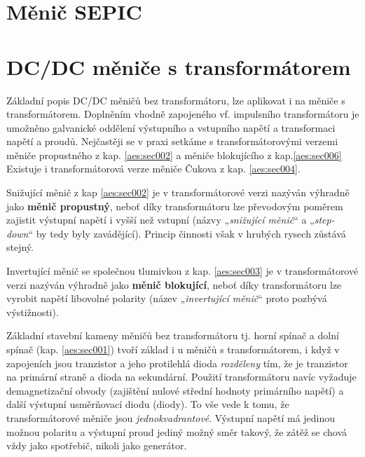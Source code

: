   \section{Měnič SEPIC}\label{aes:sec011}


  \section{DC/DC měniče s transformátorem}\label{aes:sec007}
    Základní popis DC/DC měničů bez transformátoru, lze aplikovat i na měniče s transformátorem. 
    Doplněním vhodně zapojeného vf. impulsního transformátoru je umožněno galvanické oddělení 
    výstupního a vstupního napětí a transformaci napětí a proudů. Nejčastěji se v praxi setkáme s 
    transformátorovými verzemi měniče propustného z kap. \ref{aes:sec002} a měniče 
    blokujícího z kap.\ref{aes:sec006} Existuje i transformátorová verze měniče Čukova z kap. 
    \ref{aes:sec004}.
  
    Snižující měnič z kap \ref{aes:sec002} je v transformátorové verzi nazýván výhradně jako
    \textbf{měnič propustný}, neboť díky transformátoru lze převodovým poměrem zajistit výstupní 
    napětí i vyšší než vstupní (názvy „\emph{snižující měnič}“ a „\emph{step-down}“ by tedy byly 
    zavádějící). Princip činnosti však v hrubých rysech zůstává stejný.
  
    Invertující měnič se společnou tlumivkou z kap. \ref{aes:sec003} je v transformátorové 
    verzi nazýván výhradně jako \textbf{měnič blokující}, neboť díky transformátoru lze vyrobit 
    napětí libovolné polarity (název „\emph{invertující měnič}“ proto pozbývá výstižnosti).
  
    Základní stavební kameny měničů bez transformátoru tj. horní spínač a dolní spínač (kap.
    \ref{aes:sec001}) tvoří základ i u měničů s transformátorem, i když v zapojeních 
    jsou tranzistor a jeho protilehlá dioda \emph{rozděleny} tím, že je tranzistor na primární 
    straně a dioda na sekundární. Použití transformátoru navíc vyžaduje demagnetizační obvody 
    (zajištění nulové střední hodnoty primárního napětí) a další výstupní usměrňovací diodu 
    (diody). To vše vede k tomu, že transformátorové měniče jsou \emph{jednokvadrantové}. Výstupní 
    napětí má jedinou možnou polaritu a výstupní proud jediný možný směr takový, že zátěž se chová 
    vždy jako spotřebič, nikoli jako generátor.

    

